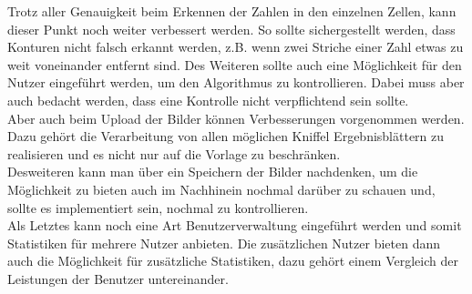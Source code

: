 Trotz aller Genauigkeit beim Erkennen der Zahlen in den einzelnen Zellen, kann dieser Punkt noch weiter verbessert werden. So sollte sichergestellt werden, dass Konturen nicht falsch erkannt werden, z.B. wenn zwei Striche einer Zahl etwas zu weit voneinander entfernt sind. Des Weiteren sollte auch eine Möglichkeit für den Nutzer eingeführt werden, um den Algorithmus zu kontrollieren. Dabei muss aber auch bedacht werden, dass eine Kontrolle nicht verpflichtend sein sollte.\\\hfill
Aber auch beim Upload der Bilder können Verbesserungen vorgenommen werden. Dazu gehört die Verarbeitung von allen möglichen Kniffel Ergebnisblättern zu realisieren und es nicht nur auf die Vorlage zu beschränken.\\\hfill
Desweiteren kann man über ein Speichern der Bilder nachdenken, um die Möglichkeit zu bieten auch im Nachhinein nochmal darüber zu schauen und, sollte es implementiert sein, nochmal zu kontrollieren.\\\hfill
Als Letztes kann noch eine Art Benutzerverwaltung eingeführt werden und somit Statistiken für mehrere Nutzer anbieten. Die zusätzlichen Nutzer bieten dann auch die Möglichkeit für zusätzliche Statistiken, dazu gehört einem Vergleich der Leistungen der Benutzer untereinander.
